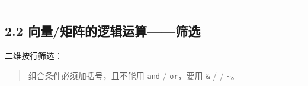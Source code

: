 \begin{center}\rule{0.5\linewidth}{0.5pt}\end{center}

\subsection{2.2
向量/矩阵的逻辑运算------筛选}\label{ux5411ux91cfux77e9ux9635ux7684ux903bux8f91ux8fd0ux7b97ux7b5bux9009}

\begin{Shaded}
\begin{Highlighting}[]
\OperatorTok{=}\NormalTok{ np.array([}\NormalTok{, }\OperatorTok{{-}}\NormalTok{, }\NormalTok{, }\OperatorTok{{-}}\NormalTok{, }\NormalTok{])}

\NormalTok{(x[x }\OperatorTok{\textgreater{}} \NormalTok{])              }\CommentTok{\# [1 3 5]}
\NormalTok{(x[(x }\OperatorTok{\textgreater{}} \NormalTok{) }\OperatorTok{\&}\OperatorTok{\textless{}} \NormalTok{)])  }\CommentTok{\# [3]}
\OperatorTok{\textgreater{}} \NormalTok{)) }\CommentTok{\# [1 0 3 0 5]}
\end{Highlighting}
\end{Shaded}

二维按行筛选：

\begin{Shaded}
\begin{Highlighting}[]
\OperatorTok{=}\NormalTok{ np.array([[}\NormalTok{, }\NormalTok{], [}\NormalTok{, }\NormalTok{], [}\NormalTok{, }\NormalTok{]])}
\NormalTok{(m[(m[:, }\NormalTok{] }\OperatorTok{\textgreater{}} \NormalTok{) }\OperatorTok{\&}\NormalTok{ (m[:, }\NormalTok{] }\OperatorTok{\textless{}} \NormalTok{)])   }\CommentTok{\# [[6 2] [7 8]]}
\end{Highlighting}
\end{Shaded}

\begin{quote}
组合条件必须加括号，且不能用 \texttt{and} / \texttt{or}，要用
\texttt{\&} / \texttt{\textbar{}} / \texttt{\textasciitilde{}}。
\end{quote}

